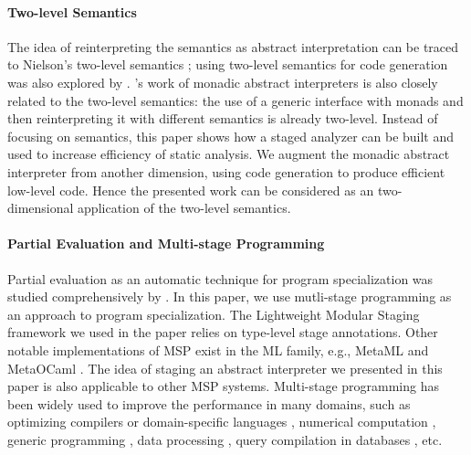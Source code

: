 \paragraph{Two-level Semantics} The idea of reinterpreting the semantics as
abstract interpretation can be traced to Nielson's two-level semantics
\cite{NIELSON1989117}; using two-level semantics for code generation
was also explored by \citet{NIELSON198859}.
\citet{Sergey:2013:MAI:2491956.2491979}'s work of monadic abstract
interpreters is also closely related to the two-level semantics: the
use of a generic interface with monads and then reinterpreting it with
different semantics is already two-level. Instead of focusing on
semantics, this paper shows how a staged analyzer can be built and
used to increase efficiency of static analysis. We augment the monadic
abstract interpreter from another dimension, using code generation to
produce efficient low-level code. Hence the presented work can be
considered as an two-dimensional application of the two-level semantics.

\paragraph{Partial Evaluation and Multi-stage Programming}
Partial evaluation as an automatic technique for program
specialization was studied comprehensively by
\citet{10.1007/3-540-61580-6_11, DBLP:books/daglib/0072559}.  In this
paper, we use mutli-stage programming as an approach to program
specialization. The Lightweight Modular Staging framework
\cite{DBLP:conf/gpce/RompfO10} we used in the paper relies on
type-level stage annotations.  Other notable implementations of MSP
exist in the ML family, e.g., MetaML \cite{DBLP:conf/pepm/TahaS97} and
MetaOCaml \cite{DBLP:conf/gpce/CalcagnoTHL03,
  DBLP:conf/flops/Kiselyov14}.  The idea of staging an abstract
interpreter we presented in this paper is also applicable to other MSP
systems.  Multi-stage programming has been widely used to improve the
performance in many domains, such as optimizing compilers or
domain-specific languages \cite{DBLP:conf/pldi/RompfSBLCO14,
  DBLP:conf/snapl/RompfBLSJAOSKDK15,
  DBLP:journals/tecs/SujeethBLRCOO14, DBLP:conf/gpce/SujeethGBLROO13,
  DBLP:journals/jfp/CaretteKS09}, numerical computation \cite{PGL-038,
  DBLP:conf/pepm/AktemurKKS13}, generic programming
\cite{DBLP:journals/pacmpl/Yallop17,
  Ofenbeck:2017:SGP:3136040.3136060}, data processing
\cite{DBLP:conf/oopsla/JonnalageddaCSRO14,
  DBLP:conf/popl/KiselyovBPS17}, query compilation in databases
\cite{DBLP:conf/osdi/EssertelTDBOR18, DBLP:conf/sigmod/TahboubER18},
etc.


